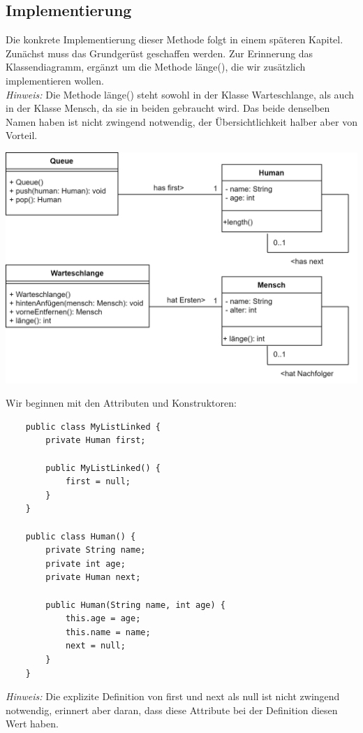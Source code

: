 \documentclass{article}
\begin{document}
\subsection{Implementierung}
Die konkrete Implementierung dieser Methode folgt in einem späteren Kapitel. Zunächst muss das
Grundgerüst geschaffen werden. Zur Erinnerung das Klassendiagramm, ergänzt um die Methode länge(), die
wir zusätzlich implementieren wollen. \\
\textit{Hinweis:} Die Methode länge() steht sowohl in der Klasse Warteschlange, als auch in der Klasse 
Mensch, da sie in beiden gebraucht wird. Das beide denselben Namen haben ist nicht zwingend notwendig,
der Übersichtlichkeit halber aber von Vorteil. 
\begin{center}
    \includegraphics[scale=0.2]{../media/linkedlist_diagram2.png}
\end{center}
Wir beginnen mit den Attributen und Konstruktoren:
\begin{verbatim}
    public class MyListLinked {
        private Human first;

        public MyListLinked() {
            first = null;
        }
    }

    public class Human() {
        private String name; 
        private int age;
        private Human next;

        public Human(String name, int age) {
            this.age = age;
            this.name = name;
            next = null;
        }
    }
\end{verbatim}
\textit{Hinweis:} Die explizite Definition von first und next als null ist nicht zwingend notwendig, 
erinnert aber daran, dass diese Attribute bei der Definition diesen Wert haben. \\
\end{document}
